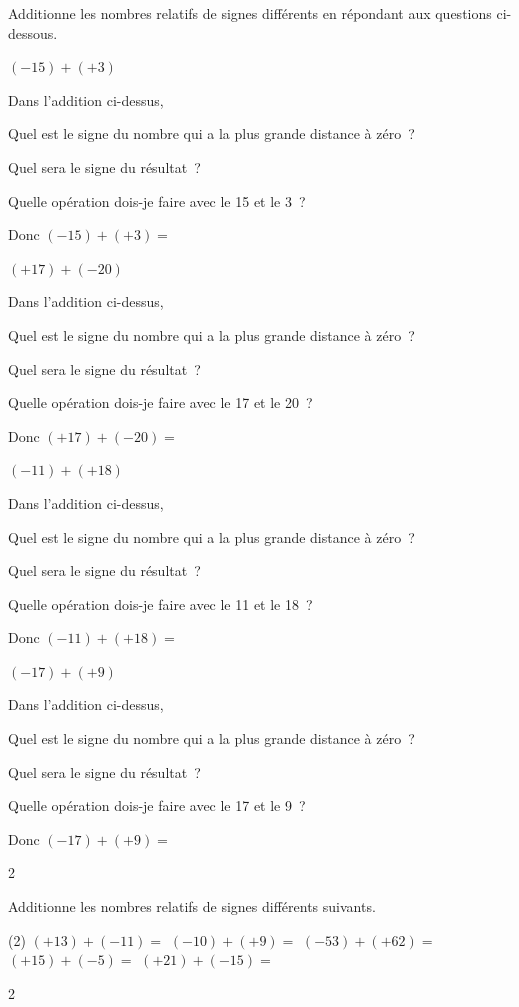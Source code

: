 \documentclass[a4paper,11pt]{report}
\begin{document}
\begin{exop}
{Additionne les nombres relatifs de signes différents en répondant aux questions ci-dessous.
\begin{tasks}[after-item-skip=0.2em]
\task $(-15)+(+3)$

Dans l'addition ci-dessus,

Quel est le signe du nombre qui a la plus grande distance à zéro~? \hrulefill

Quel sera le signe du résultat~? \hrulefill

Quelle opération dois-je faire avec le 15 et le 3~? \hrulefill

Donc $(-15)+(+3)=$ \hrulefill 

\task $(+17)+(-20)$

Dans l'addition ci-dessus,

Quel est le signe du nombre qui a la plus grande distance à zéro~? \hrulefill

Quel sera le signe du résultat~? \hrulefill

Quelle opération dois-je faire avec le 17 et le 20~? \hrulefill

Donc $(+17)+(-20)=$ \hrulefill 

\task $(-11)+(+18)$

Dans l'addition ci-dessus,

Quel est le signe du nombre qui a la plus grande distance à zéro~? \hrulefill

Quel sera le signe du résultat~? \hrulefill

Quelle opération dois-je faire avec le 11 et le 18~? \hrulefill

Donc $(-11)+(+18)=$ \hrulefill 

\task $(-17)+(+9)$

Dans l'addition ci-dessus,

Quel est le signe du nombre qui a la plus grande distance à zéro~? \hrulefill

Quel sera le signe du résultat~? \hrulefill

Quelle opération dois-je faire avec le 17 et le 9~? \hrulefill

Donc $(-17)+(+9)=$ \hrulefill 

\end{tasks}

}{2}
\end{exop}

\begin{exop}{
Additionne les nombres relatifs de signes différents suivants.
\begin{tasks}(2)
\task $(+13)+(-11)=$
\task $(-10)+(+9)=$
\task $(-53)+(+62)=$
\task $(+15)+(-5)=$
\task $(+21)+(-15)=$
\end{tasks}}{2}
\end{exop}
\end{document}
